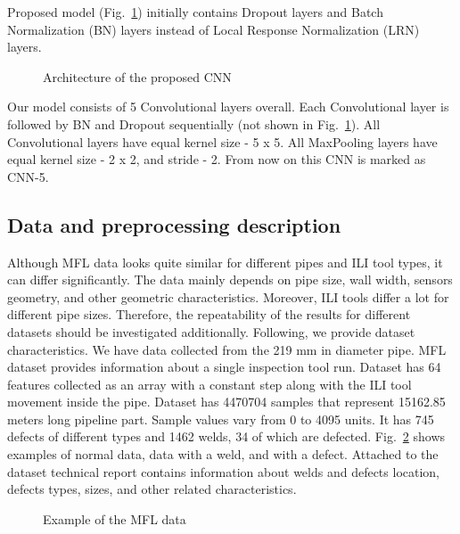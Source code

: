 Proposed model (Fig.~\ref{ris:CNN_our}) initially contains Dropout layers and Batch Normalization (BN) layers instead of Local Response Normalization (LRN) layers.
\begin{figure}[ht]
	\caption{Architecture of the proposed CNN}
	\label{ris:CNN_our}
\end{figure}
Our model consists of 5 Convolutional layers overall.
Each Convolutional layer is followed by BN and Dropout sequentially (not shown in Fig.~\ref{ris:CNN_our}).
All Convolutional layers have equal kernel size - 5 x 5.
All MaxPooling layers have equal kernel size - 2 x 2, and stride - 2.
From now on this CNN is marked as CNN-5.

\subsection{Data and preprocessing description}
Although MFL data looks quite similar for different pipes and ILI tool types, it can differ significantly.
The data mainly depends on pipe size, wall width, sensors geometry, and other geometric characteristics.
Moreover, ILI tools differ a lot for different pipe sizes.
Therefore, the repeatability of the results for different datasets should be investigated additionally.
Following, we provide dataset characteristics.
We have data collected from the 219 mm in diameter pipe.
MFL dataset provides information about a single inspection tool run.
Dataset has 64 features collected as an array with a constant step along with the ILI tool movement inside the pipe.
Dataset has 4470704 samples that represent 15162.85 meters long pipeline part.
Sample values vary from 0 to 4095 units.
It has 745 defects of different types and 1462 welds, 34 of which are defected.
Fig.~\ref{ris:defect_example} shows examples of normal data, data with a weld, and with a defect.
Attached to the dataset technical report contains information about welds and defects location, defects types, sizes, and other related characteristics.
\begin{figure}[ht]
	\caption{Example of the MFL data}
	\label{ris:defect_example}
\end{figure}

